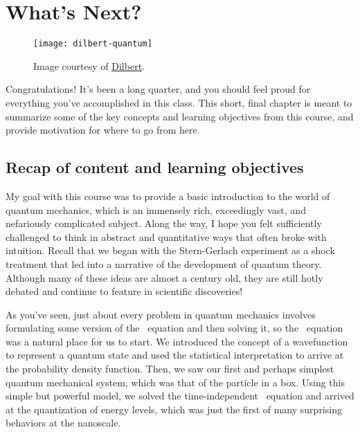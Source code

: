 %

%

\chapter{What's Next?} \label{ch:next}
\begin{figure}[!h]
	\centering
	\texttt{[image: dilbert-quantum]}
	\caption{Image courtesy of \href{http://dilbert.com/strip/2012-04-17}{Dilbert}.}
\end{figure}
Congratulations! It's been a long quarter, and you should feel proud for everything you've accomplished in this class. This short, final chapter is meant to summarize some of the key concepts and learning objectives from this course, and provide motivation for where to go from here. 

\section[Recap]{Recap of content and learning objectives}
My goal with this course was to provide a basic introduction to the world of quantum mechanics, which is an immensely rich, exceedingly vast, and nefariously complicated subject. Along the way, I hope you felt sufficiently challenged to think in abstract and quantitative ways that often broke with intuition. Recall that we began with the Stern-Gerlach experiment as a shock treatment that led into a narrative of the development of quantum theory. Although many of these ideas are almost a century old, they are still hotly debated and continue to feature in scientific discoveries! \par 

As you've seen, just about every problem in quantum mechanics involves formulating some version of the \Sch\ equation and then solving it, so the \Sch\ equation was a natural place for us to start. We introduced the concept of a wavefunction to represent a quantum state and used the statistical interpretation to arrive at the probability density function. Then, we saw our first and perhaps simplest quantum mechanical system, which was that of the particle in a box. Using this simple but powerful model, we solved the time-independent \Sch\ equation and arrived at the quantization of energy levels, which was just the first of many surprising behaviors at the nanoscale. \par 

